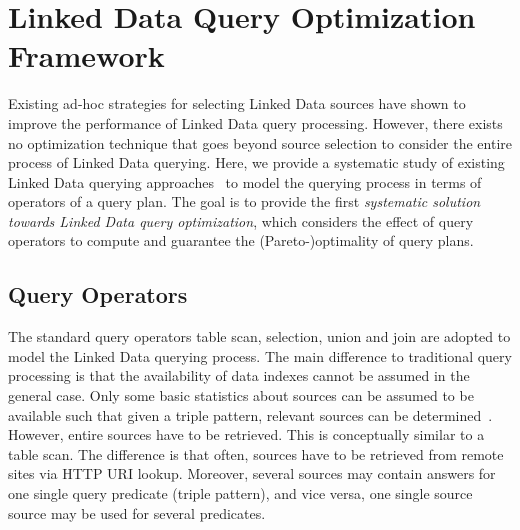 \section{Linked Data Query Optimization Framework}
\label{sec:framework}
Existing ad-hoc strategies for selecting Linked Data sources have shown to improve the performance of Linked Data query processing. However, there exists no optimization technique that goes beyond source selection to consider the entire process of Linked Data querying. Here, we provide a systematic study of existing Linked Data querying approaches~\cite{hartig_executing_2009,harth_data_2010,ladwig_linked_2010} to model the querying process in terms of operators of a query plan. The goal is to provide the first \emph{systematic solution towards Linked Data query optimization}, which considers the effect of query operators to compute and guarantee the (Pareto-)optimality of query plans. 


\subsection{Query Operators}
\label{sec:ops}
The standard query operators table scan, selection, union and join are adopted to model the Linked Data querying process. The main difference to traditional query processing is that the availability of data indexes cannot be assumed in the general case. Only some basic statistics about sources can be assumed to be available such that given a triple pattern, relevant sources can be determined~\cite{harth_data_2010,ladwig_linked_2010}. However, entire sources have to be retrieved. This is conceptually similar to a table scan. The difference is that often, sources have to be retrieved from remote sites via HTTP URI lookup. Moreover, several sources may contain answers for one single query predicate (triple pattern), and vice versa, one single source source may be used for several predicates.  

